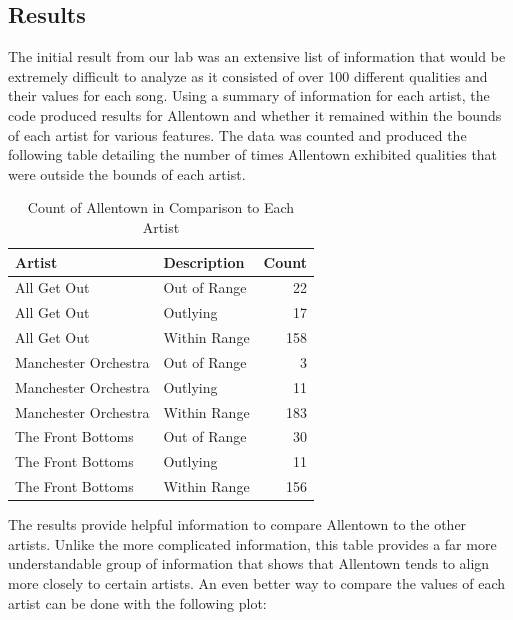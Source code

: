 \documentclass{article}\usepackage[]{graphicx}\usepackage[]{xcolor}
\begin{document}
\begin{multicols}{2}
\section{Results}
The initial result from our lab was an extensive list of information that would be extremely difficult to analyze as it consisted of over 100 different qualities and their values for each song. Using a summary of information for each artist, the code produced results for Allentown and whether it remained within the bounds of each artist for various features. The data was counted and produced the following table detailing the number of times Allentown exhibited qualities that were outside the bounds of each artist.




\begin{table}[H]
\centering
\begingroup\small
\begin{tabular}{llr}
  \hline
Artist & Description & Count \\ 
  \hline
All Get Out & Out of Range &  22 \\ 
  All Get Out & Outlying &  17 \\ 
  All Get Out & Within Range & 158 \\ 
  Manchester Orchestra & Out of Range &   3 \\ 
  Manchester Orchestra & Outlying &  11 \\ 
  Manchester Orchestra & Within Range & 183 \\ 
  The Front Bottoms & Out of Range &  30 \\ 
  The Front Bottoms & Outlying &  11 \\ 
  The Front Bottoms & Within Range & 156 \\ 
   \hline
\end{tabular}
\endgroup
\caption{Count of Allentown in Comparison to Each Artist} 
\label{count.tab}
\end{table}


The results provide helpful information to compare Allentown to the other artists. Unlike the more complicated information, this table provides a far more understandable group of information that shows that Allentown tends to align more closely to certain artists. An even better way to compare the values of each artist can be done with the following plot:


\end{multicols}
\end{document}
